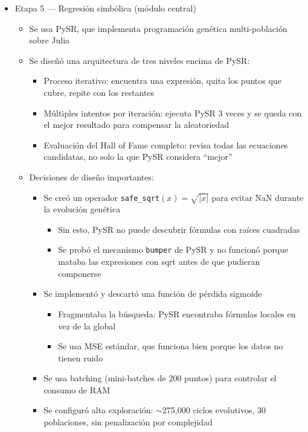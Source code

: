 \documentclass[12pt, a4paper]{article}
\begin{document}
\begin{itemize}[leftmargin=1.5em]
  \item Etapa 5 --- Regresión simbólica (módulo central)
  \begin{itemize}
\item Se usa PySR, que implementa programación genética multi-población sobre Julia \item Se diseñó una arquitectura de tres niveles encima de PySR:
    \begin{itemize}
\item Proceso iterativo: encuentra una expresión, quita los puntos que cubre, repite con los restantes \item Múltiples intentos por iteración: ejecuta PySR 3 veces y se queda con el mejor resultado para compensar la aleatoriedad \item Evaluación del Hall of Fame completo: revisa todas las ecuaciones candidatas, no solo la que PySR considera ``mejor''
    \end{itemize}
    \item Decisiones de diseño importantes:
    \begin{itemize}
      \item Se creó un operador \texttt{safe\_sqrt}$(x) = \sqrt{|x|}$ para evitar NaN durante la evolución genética
        \begin{itemize}
\item Sin esto, PySR no puede descubrir fórmulas con raíces cuadradas \item Se probó el mecanismo \texttt{bumper} de PySR y no funcionó porque mataba las expresiones con sqrt antes de que pudieran componerse
        \end{itemize}
      \item Se implementó y descartó una función de pérdida sigmoide
        \begin{itemize}
\item Fragmentaba la búsqueda: PySR encontraba fórmulas locales en vez de la global \item Se usa MSE estándar, que funciona bien porque los datos no tienen ruido
        \end{itemize}
\item Se usa batching (mini-batches de 200 puntos) para controlar el consumo de RAM \item Se configuró alta exploración: $\sim$275,000 ciclos evolutivos, 30 poblaciones, sin penalización por complejidad
    \end{itemize}
  \end{itemize}


\end{itemize}
\end{document}

